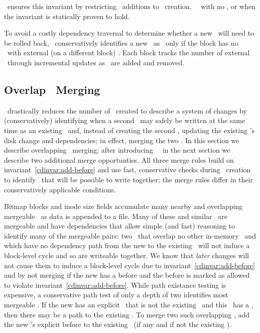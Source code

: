 %
\Kudos\ ensures this invariant by restricting \before\ additions to
\chdesc\ creation, \noop\ \chdescs\ with no \afters, or when the invariant
is statically proven to hold.

To avoid a costly dependency traversal to determine whether a new
\chdesc\ will need to be rolled back, \Kudos\ conservatively identifies
a new \chdesc\ as \nrb\ only if the block has no \chdescs\
with external (on a different block\todo{Descriptive enough? Mention
\noop\ \chdesc\ \after\ recursion?}) \afters. Each block tracks the number of
external \afters\ through incremental updates as \afters\ are added and
removed.

\subsection{Overlap \ChDesc\ Merging}
\label{sec:chdescs:overlap-merge}
\Kudos\ drastically reduces the number of \chdescs\ created to
describe a system of changes by (conservatively) identifying when a
second \chdesc\ may safely be written at the same time as an existing
\chdesc\ and, instead of creating the second \chdesc, updating the
existing \chdesc's disk change and dependencies; in effect, merging
the two \chdescs.
%
In this section we describe overlapping \chdesc\ merging; after
introducing \nrb\ \chdescs\ in the next section we describe
two additional merge opportunties.
%
All three merge rules build on invariant~\ref{cdinvar:add-before}
and use fast, conservative checks during \chdesc\ creation to identify
\chdescs\ that will be possible to write together;
%
the merge rules differ in their conservatively applicable conditions.

Bitmap blocks and inode size fields accumulate many nearby and
overlapping mergeable \chdescs\ as data is appended to a file.
%
Many of these and similar \chdescs\ are mergeable and have
dependencies that allow simple (and fast) reasoning to identify many
of the mergeable pairs: two \chdescs\ that overlap no other in-memory \chdescs\
and which have no dependency path from the new to the existing \chdesc\
will not induce a block-level cycle and so are writeable together.
We know that \textit{later} changes will not cause them to induce a block-level cycle due to
invariant~\ref{cdinvar:add-before} and by not merging if the new \chdesc{}
has a before and the before is marked as allowed to violate
invariant~\ref{cdinvar:add-before}.
%
While path existance testing is expensive, a conservative path test
of only a depth of two identifies most mergeable \chdescs. If the new
\chdesc{} has an explicit \before\ that is not the existing \chdesc\ and
this \before\ has a \before, then there may be a path to the existing
\chdesc.
%
To merge two such overlapping \chdescs, add the new \chdesc{}'s explicit
before to the existing \chdesc\ (if any and if not the existing \chdesc).

